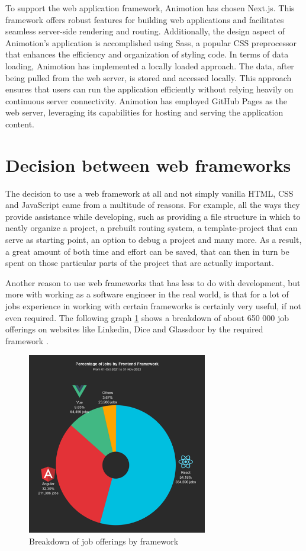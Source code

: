 To support the web application framework, Animotion has chosen Next.js. 
This framework offers robust features for building web applications and facilitates seamless server-side 
rendering and routing. Additionally, the design aspect of Animotion's application is accomplished using Sass, 
a popular CSS preprocessor that enhances the efficiency and organization of styling code.
In terms of data loading, Animotion has implemented a locally loaded approach. The data, after being 
pulled from the web server, is stored and accessed locally. This approach ensures that users can run the 
application efficiently without relying heavily on continuous server connectivity. Animotion has employed 
GitHub Pages as the web server, leveraging its capabilities for hosting and serving the application content.

\section{Decision between web frameworks}
The decision to use a web framework at all and not simply vanilla HTML, CSS and JavaScript came from a multitude of reasons.
For example, all the ways they provide assistance while developing, such as providing a file structure in which to neatly 
organize a project, a prebuilt routing system, a template-project that can serve as starting point, an option to debug a 
project and many more. As a result, a great amount of both time and effort can be saved, that can then in turn be spent on 
those particular parts of the project that are actually important.

Another reason to use web frameworks that has less to do with development, but more with working as a software engineer in 
the real world, is that for a lot of jobs experience in working with certain frameworks is certainly very useful, if not 
even required. The following graph \ref{fig:WebframeworkJobs} shows a breakdown of about 650 000 job offerings on websites like Linkedin, 
Dice and Glassdoor by the required framework \cite{WebframeworkJobs}.
\\
\begin{figure}[htb]
  \centering
  \includegraphics[width=0.7\textwidth]{pics/piechartwebframework.png}
  \caption{Breakdown of job offerings by framework}
  \label{fig:WebframeworkJobs}
\end{figure}
\\
